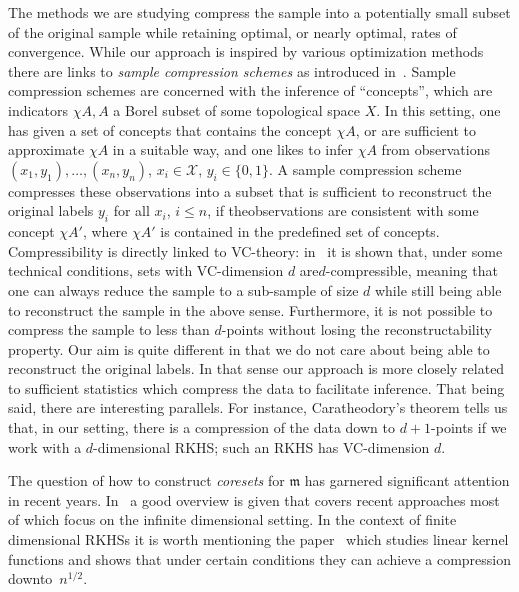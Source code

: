 \documentclass[AHL,Unicode,longabstracts,published]{cedram}
\theoremstyle{remark}
\newcommand{\X}{\mathcal{X}}
\newcommand{\mean}{\mathfrak{m}}
\begin{document}
The methods we are studying compress the sample into a potentially small subset of the original sample while retaining optimal, or nearly optimal, rates of convergence. While our approach is inspired by various optimization methods there are links to \emph{sample compression schemes} as introduced in~\cite{FLOYD95,LITTLE86}. Sample compression schemes are concerned with the inference of ``concepts'', which are indicators $\chi A, A$ a Borel subset of some topological space $X$. In this setting, one has given a set of concepts that contains the concept $\chi A$, or are sufficient to approximate $\chi A$ in a suitable way, and one likes to infer $\chi A$ from observations $(x_1,y_1), \dots, (x_n,y_n)$, $x_i \in \X$, $y_i \in \{0,1\}$. A sample compression scheme compresses these observations into a subset that is sufficient to reconstruct the original labels $y_i$ for all $x_i$, $i\leq n$, if the\linebreak observations are consistent with some concept $\chi A'$, where $\chi A'$ is contained in the predefined set of concepts. Compressibility is directly linked to VC-theory: in~\cite{FLOYD95} it is shown that, under some technical conditions, sets with VC-dimension $d$ are\linebreak $d$-compressible, meaning that one can always reduce the sample to a sub-sample of size $d$ while still being able to reconstruct the sample in the above sense. Furthermore, it is not possible to compress the sample to less than $d$-points without losing the reconstructability property. Our aim is quite different in that we do not care about being able to reconstruct the original labels. In that sense our approach is more closely related to sufficient statistics which compress the data to facilitate inference. That being said, there are interesting parallels. For instance, Caratheodory's theorem tells us that, in our setting, there is a compression of the data down to $d+1$-points if we work with a $d$-dimensional RKHS; such an RKHS has VC-dimension $d$.

The question of how to construct \emph{coresets} for $\mean$ has garnered significant attention in recent years. In~\cite{DWI21} a good overview is given that covers recent approaches most of which focus on the infinite dimensional setting. In the context of finite dimensional RKHSs it is worth mentioning the paper~\cite{HARV14} which studies linear kernel functions and shows that under certain conditions they can achieve a compression down\linebreak to~$n^{1/2}$.
\end{document}
